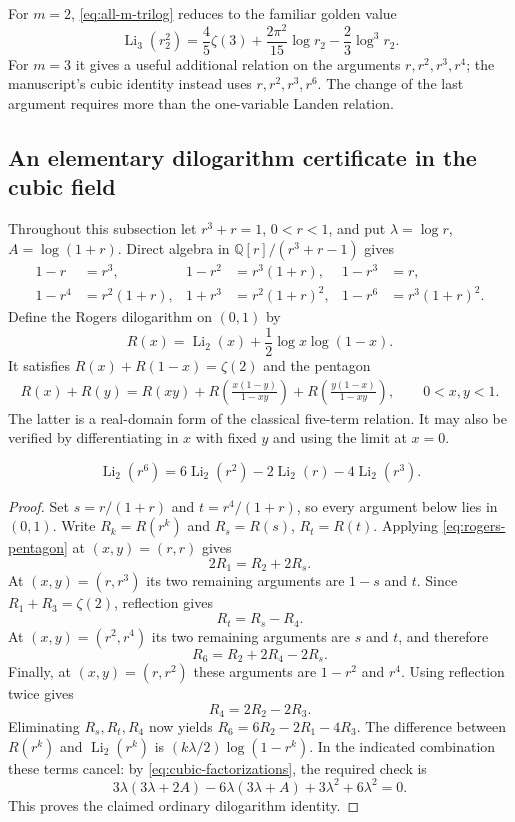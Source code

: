 For $m=2$, \eqref{eq:all-m-trilog} reduces to the familiar golden value
\[
\operatorname{Li}_3(r_2^2)
 =\frac45\zeta(3)+\frac{2\pi^2}{15}\log r_2
 -\frac23\log^3r_2.
\]
For $m=3$ it gives a useful additional relation on the arguments
$r,r^2,r^3,r^4$; the manuscript's cubic identity instead uses
$r,r^2,r^3,r^6$. The change of the last argument requires more than
the one-variable Landen relation.

\subsection{An elementary dilogarithm certificate in the cubic field}

Throughout this subsection let $r^3+r=1$, $0<r<1$, and put
$\lambda=\log r$, $A=\log(1+r)$. Direct algebra in
$\mathbb Q[r]/(r^3+r-1)$ gives
\begin{align}
1-r&=r^3,&1-r^2&=r^3(1+r),&1-r^3&=r,\\
1-r^4&=r^2(1+r),&1+r^3&=r^2(1+r)^2,
 &1-r^6&=r^3(1+r)^2.
\label{eq:cubic-factorizations}
\end{align}
Define the Rogers dilogarithm on $(0,1)$ by
\[
R(x)=\operatorname{Li}_2(x)+\frac12\log x\log(1-x).
\]
It satisfies $R(x)+R(1-x)=\zeta(2)$ and the pentagon
\begin{align}
R(x)+R(y)
 =R(xy)+R\!\left(\frac{x(1-y)}{1-xy}\right)
  +R\!\left(\frac{y(1-x)}{1-xy}\right),\qquad 0<x,y<1.
\label{eq:rogers-pentagon}
\end{align}
The latter is a real-domain form of the classical five-term relation.
It may also be verified by differentiating in $x$ with fixed $y$ and
using the limit at $x=0$.

\begin{lemma}
\label{lem:cubic-dilog}
\begin{equation}
\operatorname{Li}_2(r^6)
 =6\operatorname{Li}_2(r^2)-2\operatorname{Li}_2(r)
  -4\operatorname{Li}_2(r^3).
\label{eq:cubic-dilog}
\end{equation}
\end{lemma}

\begin{proof}
Set $s=r/(1+r)$ and $t=r^4/(1+r)$, so every argument below lies
in $(0,1)$. Write $R_k=R(r^k)$ and $R_s=R(s)$, $R_t=R(t)$.
Applying \eqref{eq:rogers-pentagon} at $(x,y)=(r,r)$ gives
\[
2R_1=R_2+2R_s.
\]
At $(x,y)=(r,r^3)$ its two remaining arguments are $1-s$ and $t$.
Since $R_1+R_3=\zeta(2)$, reflection gives
\[
R_t=R_s-R_4.
\]
At $(x,y)=(r^2,r^4)$ its two remaining arguments are $s$ and $t$,
and therefore
\[
R_6=R_2+2R_4-2R_s.
\]
Finally, at $(x,y)=(r,r^2)$ these arguments are $1-r^2$ and $r^4$.
Using reflection twice gives
\[
R_4=2R_2-2R_3.
\]
Eliminating $R_s,R_t,R_4$ now yields
$R_6=6R_2-2R_1-4R_3$. The difference between $R(r^k)$ and
$\operatorname{Li}_2(r^k)$ is
$(k\lambda/2)\log(1-r^k)$. In the indicated combination these
terms cancel: by \eqref{eq:cubic-factorizations}, the required check is
\[
3\lambda(3\lambda+2A)
 -6\lambda(3\lambda+A)+3\lambda^2+6\lambda^2=0.
\]
This proves the claimed ordinary dilogarithm identity.
\end{proof}

